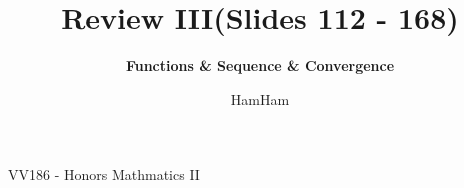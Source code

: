\documentclass{beamer}
\title{\sffamily Review III(Slides 112 - 168)}
\subtitle{\textbf{Functions \& Sequence \& Convergence}\\ }
\institute[UM-SJTU JI]{University of Michigan-Shanghai Jiao Tong University Joint Institute}
\author{HamHam}
\newcommand{\myfont}{\rmfamily\normalsize\upshape\mdseries}
\begin{document}
\begin{titlepage}
    \begin{center}
        VV186 - Honors Mathmatics II
    \end{center}
\end{titlepage}
\myfont
\end{document}
